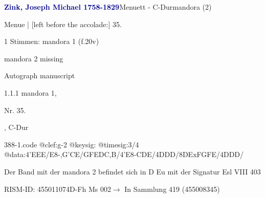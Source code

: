 \documentclass[twocolumn]{book}
\begin{document}
\par \vspace{7pt} \textcolor{darkblue}{\textbf{Zink, Joseph Michael  1758-1829}}\hfillplus{\textbf{[388]}}\newline Menuett - C-Dur\newline mandora (2)
\par \begin{itshape}[f.20v, at left:] Menue | [left before the accolade:] 35.\end{itshape} 
\par \textcolor{darkblue}{}  1 Stimmen: mandora 1  (f.20v)\newline \begin{small} mandora 2 missing\end{small} \newline Autograph manuscript
\par 1.1.1  mandora 1, \begin{itshape}Nr. 35.\end{itshape}, C-Dur  
\begin{filecontents*}{388-1.code}
@clef:g-2
@keysig:
@timesig:3/4
@data:4'EEE/E8-,G'CE/GFEDC,B/4'E8-CDE/4DDD/8DExFGFE/4DDD/
\end{filecontents*}
\newline
%
\par Der Band mit der mandora 2 befindet sich in D Eu mit der Signatur Esl VIII 403
\par RISM-ID: 455011074\newline D-Fh  Ms 002\newline $\rightarrow$ In Sammlung 419 (455008345)
      
\end{document}
